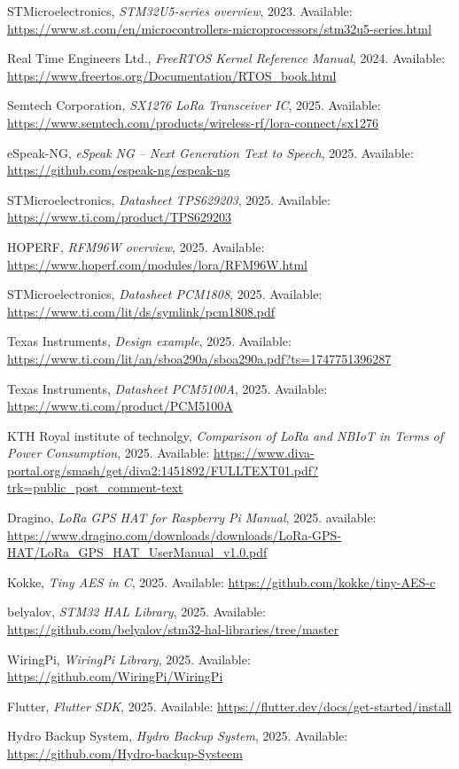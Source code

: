 \begin{thebibliography}{1}
STMicroelectronics,
\textit{STM32U5-series overview},
2023.
Available: \url{https://www.st.com/en/microcontrollers-microprocessors/stm32u5-series.html}

Real Time Engineers Ltd.,
\textit{FreeRTOS Kernel Reference Manual},
2024.
Available: \url{https://www.freertos.org/Documentation/RTOS_book.html}

Semtech Corporation,
\textit{SX1276 LoRa Transceiver IC},
2025.
Available: \url{https://www.semtech.com/products/wireless-rf/lora-connect/sx1276}

eSpeak-NG, 
\textit{eSpeak NG -- Next Generation Text to Speech}, 
2025. 
Available: \url{https://github.com/espeak-ng/espeak-ng}

STMicroelectronics,
\textit{Datasheet TPS629203}, 
2025. 
Available: \url{https://www.ti.com/product/TPS629203}

HOPERF,
\textit{RFM96W overview}, 
2025. 
Available: \url{https://www.hoperf.com/modules/lora/RFM96W.html}

STMicroelectronics,
\textit{Datasheet PCM1808}, 
2025. 
Available: \url{https://www.ti.com/lit/ds/symlink/pcm1808.pdf}

Texas Instruments,
\textit{Design example}, 
2025. 
Available: \url{https://www.ti.com/lit/an/sboa290a/sboa290a.pdf?ts=1747751396287}

Texas Instruments,
\textit{Datasheet PCM5100A}, 
2025. 
Available: \url{https://www.ti.com/product/PCM5100A}

KTH Royal institute of technolgy,
\textit{Comparison of LoRa and NBIoT in Terms of Power
Consumption}, 
2025. 
Available: \url{https://www.diva-portal.org/smash/get/diva2:1451892/FULLTEXT01.pdf?trk=public_post_comment-text}

Dragino,
\textit{LoRa GPS HAT for Raspberry Pi Manual},
2025.
available: \url{https://www.dragino.com/downloads/downloads/LoRa-GPS-HAT/LoRa_GPS_HAT_UserManual_v1.0.pdf}

Kokke,
\textit{Tiny AES in C},
2025.
Available: \url{https://github.com/kokke/tiny-AES-c}

belyalov,
\textit{STM32 HAL Library},
2025.
Available: \url{https://github.com/belyalov/stm32-hal-libraries/tree/master}

WiringPi,
\textit{WiringPi Library},
2025.
Available: \url{https://github.com/WiringPi/WiringPi}

Flutter,
\textit{Flutter SDK},
2025.
Available: \url{https://flutter.dev/docs/get-started/install}

Hydro Backup System,
\textit{Hydro Backup System},
2025.
Available: \url{https://github.com/Hydro-backup-Systeem}

\end{thebibliography}
